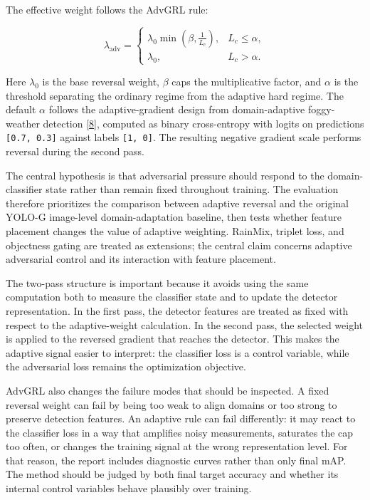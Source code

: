 \documentclass[
  11pt,
]{article}
\begin{document}
The effective weight follows the AdvGRL rule:

\[
\lambda_{\mathrm{adv}} =
\begin{cases}
\lambda_0 \min\!\left(\beta, \frac{1}{L_c}\right), & L_c \le \alpha, \\
\lambda_0, & L_c > \alpha.
\end{cases}
\]

Here \(\lambda_0\) is the base reversal weight, \(\beta\) caps the
multiplicative factor, and \(\alpha\) is the threshold separating the
ordinary regime from the adaptive hard regime. The default \(\alpha\)
follows the adaptive-gradient design from domain-adaptive foggy-weather
detection \protect\hyperlink{ref-li2022domainadaptivefoggy}{{[}8{]}},
computed as binary cross-entropy with logits on predictions
\texttt{{[}0.7,\ 0.3{]}} against labels \texttt{{[}1,\ 0{]}}. The
resulting negative gradient scale performs reversal during the second
pass.

The central hypothesis is that adversarial pressure should respond to
the domain-classifier state rather than remain fixed throughout
training. The evaluation therefore prioritizes the comparison between
adaptive reversal and the original YOLO-G image-level domain-adaptation
baseline, then tests whether feature placement changes the value of
adaptive weighting. RainMix, triplet loss, and objectness gating are
treated as extensions; the central claim concerns adaptive adversarial
control and its interaction with feature placement.

The two-pass structure is important because it avoids using the same
computation both to measure the classifier state and to update the
detector representation. In the first pass, the detector features are
treated as fixed with respect to the adaptive-weight calculation. In the
second pass, the selected weight is applied to the reversed gradient
that reaches the detector. This makes the adaptive signal easier to
interpret: the classifier loss is a control variable, while the
adversarial loss remains the optimization objective.

AdvGRL also changes the failure modes that should be inspected. A fixed
reversal weight can fail by being too weak to align domains or too
strong to preserve detection features. An adaptive rule can fail
differently: it may react to the classifier loss in a way that amplifies
noisy measurements, saturates the cap too often, or changes the training
signal at the wrong representation level. For that reason, the report
includes diagnostic curves rather than only final mAP. The method should
be judged by both final target accuracy and whether its internal control
variables behave plausibly over training.
\end{document}
